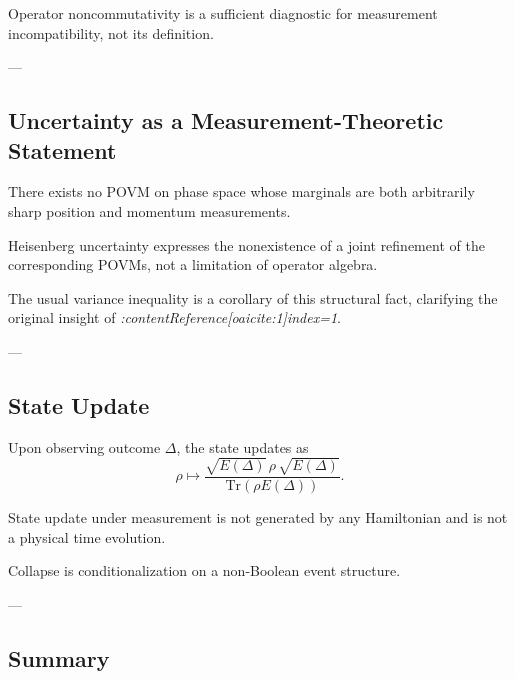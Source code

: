 \documentclass[11pt]{article}
\begin{document}
\begin{remark}
Operator noncommutativity is a sufficient diagnostic for measurement
incompatibility, not its definition.
\end{remark}

---

\subsection*{Uncertainty as a Measurement-Theoretic Statement}

\begin{theorem}
There exists no POVM on phase space whose marginals are both arbitrarily
sharp position and momentum measurements.
\end{theorem}

\begin{corollary}
Heisenberg uncertainty expresses the nonexistence of a joint refinement of
the corresponding POVMs, not a limitation of operator algebra.
\end{corollary}

\begin{remark}
The usual variance inequality is a corollary of this structural fact,
clarifying the original insight of
\emph{:contentReference[oaicite:1]{index=1}}.
\end{remark}

---

\subsection*{State Update}

\begin{axiom}[Conditionalization]
Upon observing outcome $\Delta$, the state updates as
\[
\rho \mapsto
\frac{\sqrt{E(\Delta)}\,\rho\,\sqrt{E(\Delta)}}
{\mathrm{Tr}(\rho E(\Delta))}.
\]
\end{axiom}

\begin{theorem}
State update under measurement is not generated by any Hamiltonian and is
not a physical time evolution.
\end{theorem}

\begin{corollary}
Collapse is conditionalization on a non-Boolean event structure.
\end{corollary}

---

\subsection*{Summary}
\end{document}
